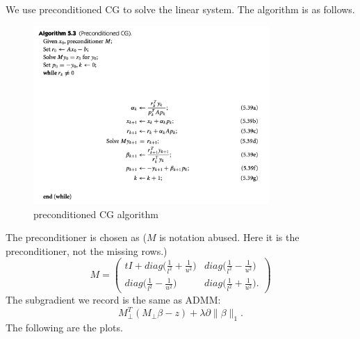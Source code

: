 \documentclass{article}
\begin{document}
We use preconditioned CG to solve the linear system. The algorithm is as follows.
\begin{figure}[H]
\centering
   		 	\includegraphics[width=0.8\textwidth]{Interior Point Method/subgradplot3_fig/preconditionedCG.png}		 	
      \caption{preconditioned CG algorithm}
\end{figure}
The preconditioner is chosen as ($M$ is notation abused. Here it is the preconditioner, not the missing rows.)
\begin{equation}
    M = \begin{pmatrix}
        tI 
+ diag\big( \frac{1}{l^2}+\frac{1}{u^2}\big) &diag\big(\frac{1}{l^2}-\frac{1}{u^2}\big)\\
        diag\big(\frac{1}{l^2}-\frac{1}{u^2}\big)
        &diag\big(\frac{1}{l^2}+\frac{1}{u^2}\big).
    \end{pmatrix}
\end{equation}
The subgradient we record is the same as ADMM:
\begin{equation}
    M_{\perp}^T(M_{\perp}\beta-z) + \lambda \partial \|\beta\|_1.
\end{equation}
The following are the plots.
\end{document}
